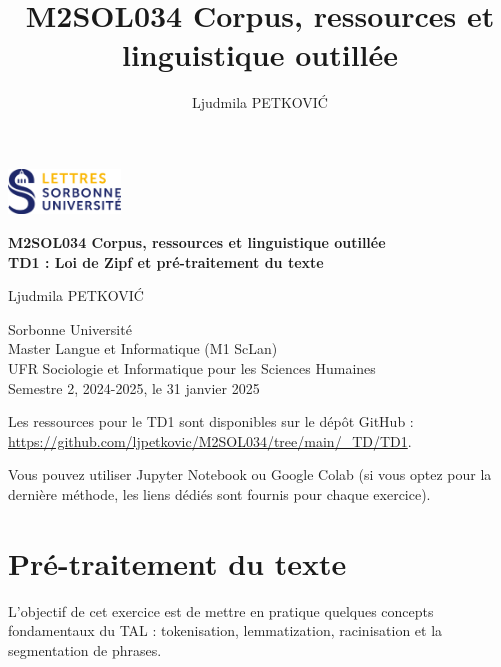 \documentclass[xcolor={table,usenames,dvipsnames}]{article}
\author{Ljudmila PETKOVI\'C}
\title{\textbf{\textsc{M2SOL034} Corpus, ressources et linguistique outillée}}
\begin{document}
	
	\begin{center}
		\includegraphics[width=3cm]{img/logo.png} %
	\end{center}
	
	\begin{tcolorbox}[colback=myblue!10, colframe=myblue, width=\textwidth, sharp corners, boxrule=1pt]
		\centering
		\Large \textbf{\textsc{M2SOL034} Corpus, ressources et linguistique outillée\\{\large\textsc{TD1} : Loi de Zipf et pré-traitement du texte}}
	\end{tcolorbox}
	
	\begin{center}
		Ljudmila PETKOVI\'C
		
		{\small Sorbonne Université\\Master \og{}Langue et Informatique\fg{} (\textsc{M1} ScLan)\\\textsc{UFR} Sociologie et Informatique pour les Sciences Humaines\\Semestre 2, 2024-2025, le 31 janvier 2025}
	\end{center}
	


		
	\tableofcontents
	
	\bigskip
	Les ressources pour le \textsc{TD1} sont disponibles sur le dépôt GitHub :\\ \url{https://github.com/ljpetkovic/M2SOL034/tree/main/\_TD/TD1}. 
	
	Vous pouvez utiliser Jupyter Notebook ou Google Colab (si vous optez pour la dernière méthode, les liens dédiés sont fournis pour chaque exercice).
	
	\section{Pré-traitement du texte}  %
	L'objectif de cet exercice est de mettre en pratique quelques concepts fondamentaux du \textsc{TAL} : tokenisation, lemmatization, racinisation et la segmentation de phrases.
	
\end{document}
